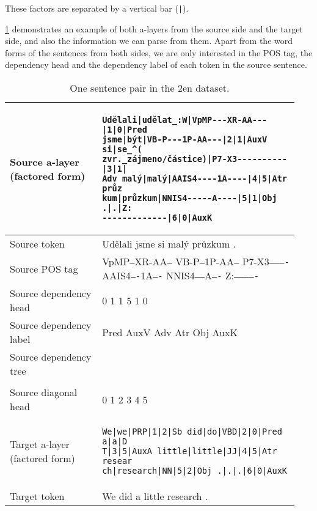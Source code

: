 These factors are separated by a vertical bar (\texttt{|}).

\cref{tab:data-czeng} demonstrates an example of both a-layers from the source side and the target side, and also the information we can parse from them. Apart from the word forms of the sentences from both sides, we are only interested in the POS tag, the dependency head and the dependency label of each token in the source sentence.

\begin{table}[t]
    \centering
    \begin{tabular}{p{0.3\linewidth}|p{0.64\linewidth}}
        Source a-layer (factored form) & 
\begin{verbatim}
Udělali|udělat_:W|VpMP---XR-AA---|1|0|Pred
jsme|být|VB-P---1P-AA---|2|1|AuxV si|se_^(
zvr._zájmeno/částice)|P7-X3----------|3|1|
Adv malý|malý|AAIS4----1A----|4|5|Atr průz
kum|průzkum|NNIS4-----A----|5|1|Obj .|.|Z:
-------------|6|0|AuxK
\end{verbatim}\\
        \hline
        Source token & Udělali jsme si malý průzkum .\\
        \hline
        Source POS tag & VpMP\texttt{---}XR-AA\texttt{---} VB-P\texttt{---}1P-AA\texttt{---} P7-X3\texttt{----------} AAIS4\texttt{----}1A\texttt{----} NNIS4\texttt{-----}A\texttt{----} Z:\texttt{-------------}\\
        \hline
        Source dependency head & 0 1 1 5 1 0\\
        \hline
        Source dependency label & Pred AuxV Adv Atr Obj AuxK \\
        \hline
        Source dependency tree &
        \begin{dependency}
            \begin{deptext}
            Udělali \& jsme \& si \& malý \& průzkum \&  . \\
            \end{deptext}
            \deproot{1}{Pred}
            \depedge{2}{1}{AuxV}
            \depedge{3}{1}{Adv}
            \depedge{4}{5}{Atr}
            \depedge{5}{1}{Obj}
            \deproot{6}{AuxK}
        \end{dependency} \\
        \hline
        Source diagonal head & 0 1 2 3 4 5 \\
        \hline
        \hline
        Target a-layer (factored form) & 
\begin{verbatim}
We|we|PRP|1|2|Sb did|do|VBD|2|0|Pred a|a|D
T|3|5|AuxA little|little|JJ|4|5|Atr resear
ch|research|NN|5|2|Obj .|.|.|6|0|AuxK
\end{verbatim}\\
        \hline
        Target token & We did a little research .\\
    \end{tabular}
    \caption{One sentence pair in the \cs2en dataset.}
    \label{tab:data-czeng}
\end{table}

